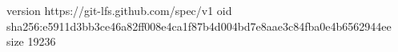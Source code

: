 version https://git-lfs.github.com/spec/v1
oid sha256:e5911d3bb3ce46a82ff008e4ca1f87b4d004bd7e8aae3c84fba0e4b6562944ee
size 19236
